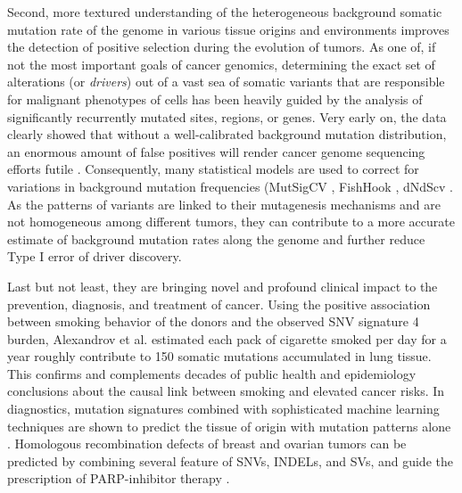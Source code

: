 \documentclass[phd,tocprelim]{cornell}
\begin{document}
Second, more textured understanding of the heterogeneous background somatic mutation rate of the genome in various tissue origins and environments improves the detection of positive selection during the evolution of tumors. As one of, if not the most important goals of cancer genomics, determining the exact set of alterations (or \textit{drivers}) out of a vast sea of somatic variants that are responsible for malignant phenotypes of cells has been heavily guided by the analysis of significantly recurrently mutated sites, regions, or genes. Very early on, the data clearly showed that without a well-calibrated background mutation distribution, an enormous amount of false positives will render cancer genome sequencing efforts futile \cite{Getz2007-wf}. Consequently, many statistical models are used to correct for variations in background mutation frequencies (MutSigCV \cite{lawrence2013}, FishHook \cite{imielinski2017}, dNdScv \cite{Martincorena2017-yt}. As the patterns of variants are linked to their mutagenesis mechanisms and are not homogeneous among different tumors, they can contribute to a more accurate estimate of background mutation rates along the genome and further reduce Type I error of driver discovery.

Last but not least, they are bringing novel and profound clinical impact to the prevention, diagnosis, and treatment of cancer. Using the positive association between smoking behavior of the donors and the observed SNV signature 4 burden, Alexandrov et al. \cite{Alexandrov2016-zs} estimated each pack of cigarette smoked per day for a year roughly contribute to 150 somatic mutations accumulated in lung tissue. This confirms and complements decades of public health and epidemiology conclusions about the causal link between smoking and elevated cancer risks. In diagnostics, mutation signatures combined with sophisticated machine learning techniques are shown to predict the tissue of origin with mutation patterns alone \cite{Jiao2020-le}. Homologous recombination defects of breast and ovarian tumors can be predicted by combining several feature of SNVs, INDELs, and SVs, and guide the prescription of PARP-inhibitor therapy \cite{Davies:2017642}.
\end{document}

